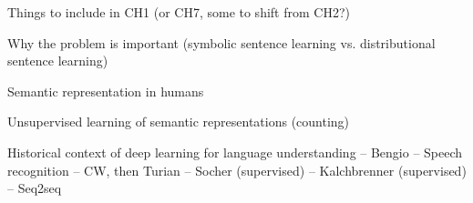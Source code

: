 
Things to include in CH1 (or CH7, some to shift from CH2?)

Why the problem is important
(symbolic sentence learning vs. distributional sentence learning)

Semantic representation in humans

Unsupervised learning of semantic representations (counting)

Historical context of deep learning for language understanding
-- Bengio
-- Speech recognition
-- CW, then Turian
-- Socher (supervised)
-- Kalchbrenner (supervised)
-- Seq2seq

